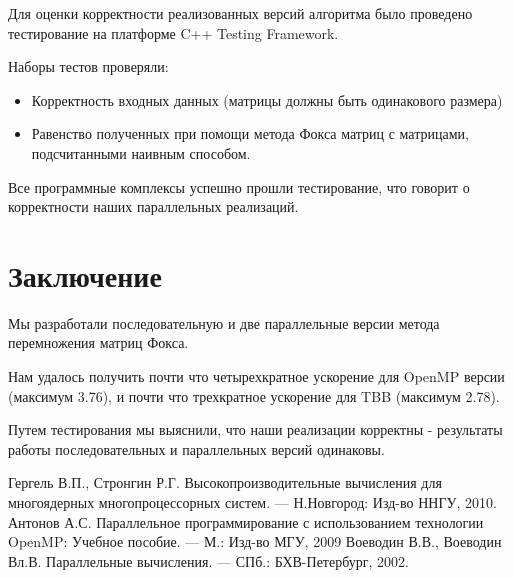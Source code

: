\documentclass{article}
\begin{document}
\par Для оценки корректности реализованных версий алгоритма было проведено тестирование на платформе C++ Testing Framework.
\par Наборы тестов проверяли:
\begin{itemize}
  \item Корректность входных данных (матрицы должны быть одинакового размера)
  \item Равенство полученных при помощи метода Фокса матриц с матрицами, подсчитанными наивным способом. 
\end{itemize}

\par Все программные комплексы успешно прошли тестирование, что говорит о корректности наших параллельных реализаций.
\newpage

\section*{Заключение}
\par Мы разработали последовательную и две параллельные версии метода перемножения матриц Фокса.
\par Нам удалось получить почти что четырехкратное ускорение для OpenMP версии (максимум 3.76), 
и почти что трехкратное ускорение для TBB (максимум 2.78). 
\par 
Путем тестирования мы выяснили, что наши реализации корректны - результаты
работы последовательных и параллельных версий одинаковы.
\newpage

\begin{thebibliography}{1}
 Гергель В.П., Стронгин Р.Г. Высокопроизводительные вычисления для многоядерных многопроцессорных систем. 
— Н.Новгород: Изд-во ННГУ, 2010.
 Антонов А.С. Параллельное программирование с использованием технологии
OpenMP: Учебное пособие. — М.: Изд-во МГУ, 2009
 Воеводин В.В., Воеводин Вл.В. Параллельные вычисления. — СПб.: БХВ-Петербург, 2002. 
\end{thebibliography}
\newpage

\end{document}
